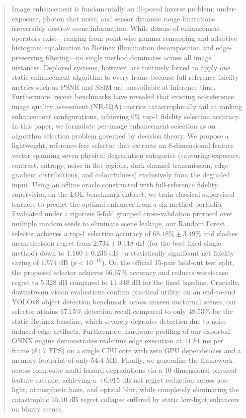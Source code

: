 \documentclass[journal]{IEEEtran}
\begin{document}
\begin{abstract}
Image enhancement is fundamentally an ill-posed inverse problem: under-exposure, photon shot noise, and sensor dynamic range limitations irreversibly destroy scene information. While dozens of enhancement operators exist—ranging from point-wise gamma remapping and adaptive histogram equalization to Retinex illumination decomposition and edge-preserving filtering—no single method dominates across all image instances. Deployed systems, however, are routinely forced to apply one static enhancement algorithm to every frame because full-reference fidelity metrics such as PSNR and SSIM are unavailable at inference time. Furthermore, recent benchmarks have revealed that existing no-reference image quality assessment (NR-IQA) metrics catastrophically fail at ranking enhancement configurations, achieving 0\% top-1 fidelity selection accuracy. In this paper, we formulate per-image enhancement selection as an algorithm selection problem governed by decision theory. We propose a lightweight, reference-free selector that extracts an 8-dimensional feature vector spanning seven physical degradation categories (capturing exposure, contrast, entropy, noise in flat regions, dark channel transmission, edge gradient distributions, and colourfulness) exclusively from the degraded input. Using an offline oracle constructed with full-reference fidelity supervision on the LOL benchmark dataset, we train classical supervised learners to predict the optimal enhancer from a six-method portfolio. Evaluated under a rigorous 5-fold grouped cross-validation protocol over multiple random seeds to eliminate scene leakage, our Random Forest selector achieves a top-1 selection accuracy of $68.18\% \pm 3.49\%$ and slashes mean decision regret from $2.734 \pm 0.118\text{ dB}$ (for the best fixed single method) down to $1.160 \pm 0.236\text{ dB}$—a statistically significant net fidelity saving of $1.574\text{ dB}$ ($p < 10^{-10}$). On the official 15-pair held-out test split, the proposed selector achieves $66.67\%$ accuracy and reduces worst-case regret to $5.328\text{ dB}$ compared to $11.448\text{ dB}$ for the fixed baseline. Crucially, downstream vision evaluations confirm practical utility: on an end-to-end YOLOv8 object detection benchmark across unseen nocturnal scenes, our selector attains $67.15\%$ detection recall compared to only $48.53\%$ for the static Retinex baseline, which severely degrades detection due to noise-induced edge artifacts. Furthermore, hardware profiling of our exported ONNX engine demonstrates real-time edge execution at $11.81\text{ ms}$ per frame ($84.7\text{ FPS}$) on a single CPU core with zero GPU dependencies and a memory footprint of only $54.4\text{ MB}$. Finally, we generalize the framework across composite multi-hazard degradations via a 10-dimensional physical feature cascade, achieving a $+0.915\text{ dB}$ net regret reduction across low-light, atmospheric haze, and optical blur, while completely eliminating the catastrophic $15.10\text{ dB}$ regret collapse suffered by static low-light enhancers on blurry scenes.
\end{abstract}
\end{document}
